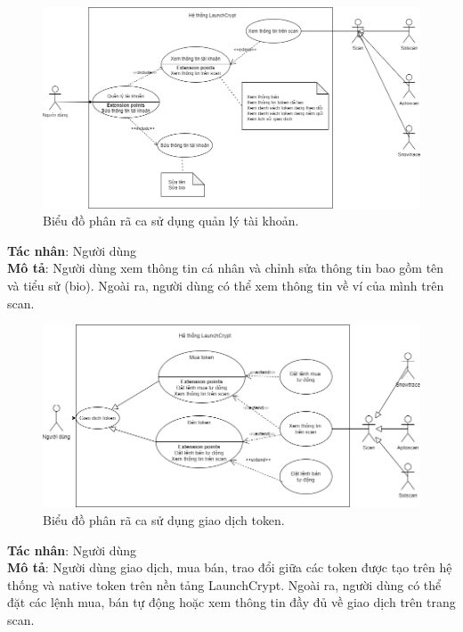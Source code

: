 \begin{figure}[H]
    \begin{center}
        \includegraphics[width=1\textwidth]{figures/c2/User Management.png}
        \caption{Biểu đồ phân rã ca sử dụng quản lý tài khoản.}
        \label{fig:feature_interaction_example}
    \end{center}
\end{figure}
\hspace{-1cm}\textbf{Tác nhân}: Người dùng \\
\textbf{Mô tả}: Người dùng xem thông tin cá nhân và chỉnh sửa thông tin bao gồm
tên và tiểu sử (bio). Ngoài ra, người dùng có thể xem thông tin về ví của mình
trên scan.
\clearpage
\begin{figure}[H]
    \begin{center}
        \includegraphics[width=1\textwidth]{figures/c2/TradeUCDiagram.png}
        \caption{Biểu đồ phân rã ca sử dụng giao dịch token.}
        \label{fig:feature_interaction_example}
    \end{center}
\end{figure}
\hspace{-1cm}\textbf{Tác nhân}: Người dùng \\
\textbf{Mô tả}: Người dùng giao dịch, mua bán, trao đổi giữa các token được tạo trên hệ thống và native token
trên nền tảng LaunchCrypt. Ngoài ra, người dùng có thể đặt các lệnh mua, bán tự động hoặc xem thông tin đầy đủ 
về giao dịch trên trang scan.
\clearpage

